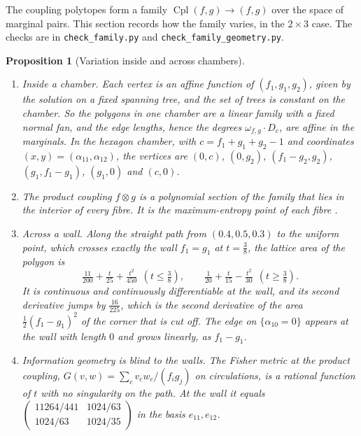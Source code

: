 \documentclass[11pt]{article}
\newtheorem{proposition}[theorem]{Proposition}
\theoremstyle{definition}
\theoremstyle{remark}
\newcommand{\Cpl}{\operatorname{Cpl}}
\begin{document}
The coupling polytopes form a family $\Cpl(f,g)\to(f,g)$ over the space of marginal pairs. This section records
how the family varies, in the $2\times3$ case. The checks are in \texttt{check\_family.py} and
\texttt{check\_family\_geometry.py}.

\begin{proposition}[Variation inside and across chambers]\label{prop:family}
\leavevmode
\begin{enumerate}[label=(\roman*),leftmargin=*]
\item \emph{Inside a chamber.} Each vertex is an affine function of $(f_1,g_1,g_2)$, given by the solution on a fixed
  spanning tree, and the set of trees is constant on the chamber. So the polygons in one chamber are a linear family
  with a fixed normal fan, and the edge lengths, hence the degrees $\omega_{f,g}\cdot D_c$, are affine in the marginals.
  In the hexagon chamber, with $c=f_1+g_1+g_2-1$ and coordinates $(x,y)=(\alpha_{11},\alpha_{12})$, the vertices are
  $(0,c)$, $(0,g_2)$, $(f_1-g_2,g_2)$, $(g_1,f_1-g_1)$, $(g_1,0)$ and $(c,0)$.
\item \emph{The product coupling} $f\otimes g$ is a polynomial section of the family that lies in the interior of every
  fibre. It is the maximum-entropy point of each fibre \cite[Prop.~6.5]{Conditionals}.
\item \emph{Across a wall.} Along the straight path from $(0.4,0.5,0.3)$ to the uniform point, which crosses exactly the
  wall $f_1=g_1$ at $t=\tfrac38$, the lattice area of the polygon is
  \[
  \tfrac{11}{200}+\tfrac t{25}+\tfrac{t^2}{450}\ \ (t\le\tfrac38),\qquad \tfrac1{20}+\tfrac t{15}-\tfrac{t^2}{30}\ \ (t\ge\tfrac38).
  \]
  It is continuous and continuously differentiable at the wall, and its second derivative jumps by $\tfrac{16}{225}$, which
  is the second derivative of the area $\tfrac12(f_1-g_1)^2$ of the corner that is cut off. The edge on
  $\{\alpha_{10}=0\}$ appears at the wall with length $0$ and grows linearly, as $f_1-g_1$.
\item \emph{Information geometry is blind to the walls.} The Fisher metric at the product coupling,
  $G(v,w)=\sum_cv_cw_c/(f_ig_j)$ on circulations, is a rational function of $t$ with no singularity on the path. At the wall
  it equals $\left(\begin{smallmatrix}11264/441&1024/63\\1024/63&1024/35\end{smallmatrix}\right)$ in the basis
  $e_{11},e_{12}$.
\end{enumerate}
\end{proposition}
\end{document}
